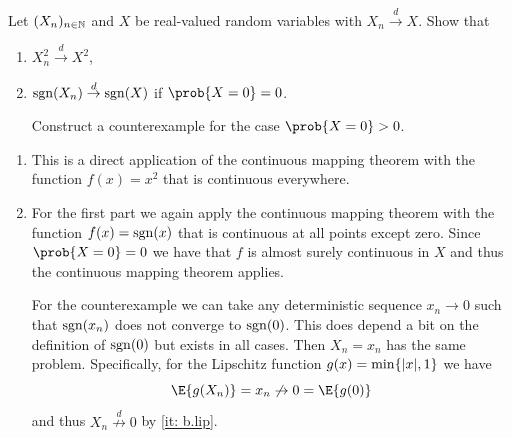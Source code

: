 

\begin{exercise}[subtitle={Basic application of continuous mapping theorem \Coffeecup}]
    Let \((X_n)_{n\in \mathbb{N}}\) and \(X\) be real-valued random variables
    with \(X_n \overset{d}\to X\). Show that
    \begin{enumerate}[label=(\alph*), noitemsep]
        \item\label{it: (basic appl cont map) square}
        \(X_n^2 \overset{d}\to X^2\),

        \item\label{it: (basic appl cont map) sign}
        \(\operatorname{sgn}(X_n) \overset{d}\to \operatorname{sgn}(X)\) if \(\prob{X=0} = 0\).

        Construct a counterexample for the case \(\prob{X=0} > 0\).
    \end{enumerate}
\end{exercise}

\begin{solution}
\begin{enumerate}[wide=0pt]
    \item[\ref{it: (basic appl cont map) square}]
    This is a direct application of the continuous mapping theorem with the function \(f(x) = x^2\) that is continuous everywhere.            

    \item[\ref{it: (basic appl cont map) sign}]
    For the first part we again apply the continuous mapping theorem with the function \(f(x) = \operatorname{sgn}(x)\) that is continuous at all points except zero. Since \(\prob{X=0} = 0\) we have that \(f\) is almost surely continuous in \(X\) and thus the continuous mapping theorem applies.

    For the counterexample we can take any deterministic sequence \(x_n\to 0\)
    such that \(\operatorname{sgn}(x_n)\) does not converge to \(\operatorname{sgn}(0)\). This does depend a bit on the definition
    of \(\operatorname{sgn}(0)\) but exists in all cases. Then \(X_n = x_n\) has the same problem.
    Specifically, for the Lipschitz function \(g(x) = \min\{\lvert x\rvert,
    1\}\) we have
    \[
        \E{g(X_n)} = x_n \not\to 0 = \E{g(0)}
    \]
    and thus \(X_n \overset{d}{\not\to} 0\) by \ref{it: b.lip}.
    \qedhere
\end{enumerate}
\end{solution}

